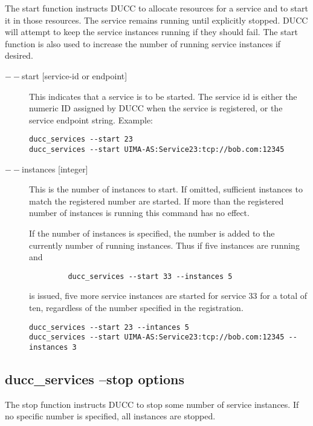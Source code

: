     The start function instructs DUCC to allocate resources for a service and to start it in those
    resources. The service remains running until explicitly stopped. DUCC will attempt to keep the
    service instances running if they should fail. The start function is also used to increase the
    number of running service instances if desired.
    
       \begin{description}
       \item[$--$start {[service-id or endpoint]}] This indicates that a service is to be started. The service id
         is either the numeric ID assigned by DUCC when the service is registered, or the service
         endpoint string.  Example:
\begin{verbatim}
ducc_services --start 23 
ducc_services --start UIMA-AS:Service23:tcp://bob.com:12345 
\end{verbatim}
         
       \item[$--$instances {[integer]}] This is the number of instances to start. If omitted, sufficient
         instances to match the registered number are started. If more than the registered number of
         instances is running this command has no effect.

         If the number of instances is specified, the number is added
         to the currently number of running instances. Thus if five instances are running and
\begin{verbatim}
         ducc_services --start 33 --instances 5
\end{verbatim}
         is issued, five more service instances are started for service 33 for a total of ten,
         regardless of the number specified in the registration. 
\begin{verbatim}
ducc_services --start 23 --intances 5 
ducc_services --start UIMA-AS:Service23:tcp://bob.com:12345 --instances 3 
\end{verbatim}

       \end{description}

    \subsection{ducc\_services --stop options}
    The stop function instructs DUCC to stop some number of service instances. If no specific number
    is specified, all instances are stopped.

